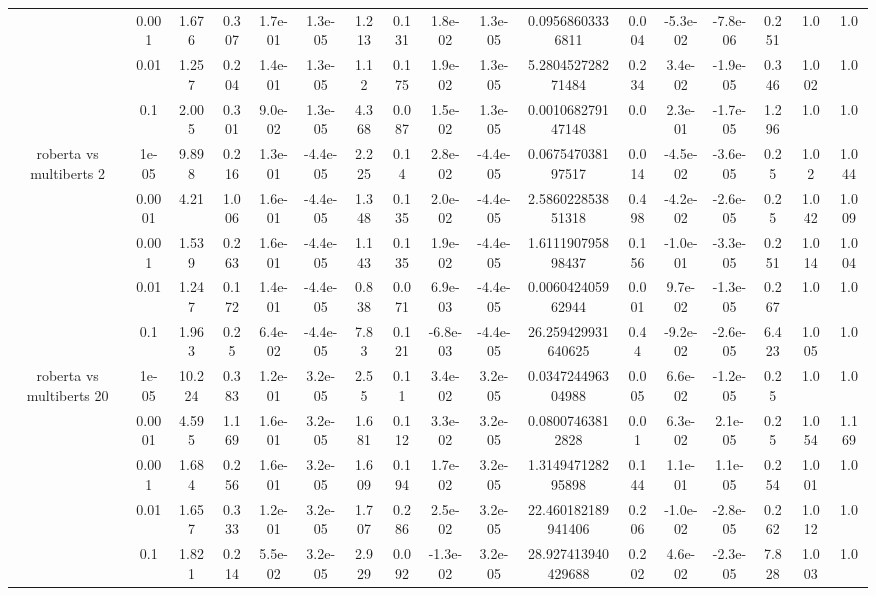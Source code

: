 \begin{tabular}{|c|c|c|c|c|c|c|c|c|c|c|c|c|c|c|c|c|}
 & 0.001 & 1.676 & 0.307 & 1.7e-01 & 1.3e-05 & 1.213 & 0.131 & 1.8e-02 & 1.3e-05 & 0.09568603336811 & 0.004 & -5.3e-02 & -7.8e-06 & 0.251 & 1.0 & 1.0 \\
 & 0.01 & 1.257 & 0.204 & 1.4e-01 & 1.3e-05 & 1.12 & 0.175 & 1.9e-02 & 1.3e-05 & 5.280452728271484 & 0.234 & 3.4e-02 & -1.9e-05 & 0.346 & 1.002 & 1.0 \\
 & 0.1 & 2.005 & 0.301 & 9.0e-02 & 1.3e-05 & 4.368 & 0.087 & 1.5e-02 & 1.3e-05 & 0.001068279147148 & 0.0 & 2.3e-01 & -1.7e-05 & 1.296 & 1.0 & 1.0 \\
\hline
\multirow{5}{*}{roberta  vs multiberts 2} & 1e-05 & 9.898 & 0.216 & 1.3e-01 & -4.4e-05 & 2.225 & 0.14 & 2.8e-02 & -4.4e-05 & 0.067547038197517 & 0.014 & -4.5e-02 & -3.6e-05 & 0.25 & 1.02 & 1.044 \\
 & 0.0001 & 4.21 & 1.006 & 1.6e-01 & -4.4e-05 & 1.348 & 0.135 & 2.0e-02 & -4.4e-05 & 2.586022853851318 & 0.498 & -4.2e-02 & -2.6e-05 & 0.25 & 1.042 & 1.009 \\
 & 0.001 & 1.539 & 0.263 & 1.6e-01 & -4.4e-05 & 1.143 & 0.135 & 1.9e-02 & -4.4e-05 & 1.611190795898437 & 0.156 & -1.0e-01 & -3.3e-05 & 0.251 & 1.014 & 1.004 \\
 & 0.01 & 1.247 & 0.172 & 1.4e-01 & -4.4e-05 & 0.838 & 0.071 & 6.9e-03 & -4.4e-05 & 0.006042405962944 & 0.001 & 9.7e-02 & -1.3e-05 & 0.267 & 1.0 & 1.0 \\
 & 0.1 & 1.963 & 0.25 & 6.4e-02 & -4.4e-05 & 7.83 & 0.121 & -6.8e-03 & -4.4e-05 & 26.259429931640625 & 0.44 & -9.2e-02 & -2.6e-05 & 6.423 & 1.005 & 1.0 \\
\hline
\multirow{5}{*}{roberta  vs multiberts 20} & 1e-05 & 10.224 & 0.383 & 1.2e-01 & 3.2e-05 & 2.55 & 0.11 & 3.4e-02 & 3.2e-05 & 0.034724496304988 & 0.005 & 6.6e-02 & -1.2e-05 & 0.25 & 1.0 & 1.0 \\
 & 0.0001 & 4.595 & 1.169 & 1.6e-01 & 3.2e-05 & 1.681 & 0.112 & 3.3e-02 & 3.2e-05 & 0.08007463812828 & 0.01 & 6.3e-02 & 2.1e-05 & 0.25 & 1.054 & 1.169 \\
 & 0.001 & 1.684 & 0.256 & 1.6e-01 & 3.2e-05 & 1.609 & 0.194 & 1.7e-02 & 3.2e-05 & 1.314947128295898 & 0.144 & 1.1e-01 & 1.1e-05 & 0.254 & 1.001 & 1.0 \\
 & 0.01 & 1.657 & 0.333 & 1.2e-01 & 3.2e-05 & 1.707 & 0.286 & 2.5e-02 & 3.2e-05 & 22.460182189941406 & 0.206 & -1.0e-02 & -2.8e-05 & 0.262 & 1.012 & 1.0 \\
 & 0.1 & 1.821 & 0.214 & 5.5e-02 & 3.2e-05 & 2.929 & 0.092 & -1.3e-02 & 3.2e-05 & 28.927413940429688 & 0.202 & 4.6e-02 & -2.3e-05 & 7.828 & 1.003 & 1.0 \\

\end{tabular}
